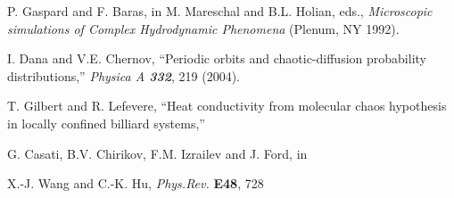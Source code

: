  P. Gaspard and F. Baras, in
	M. Mareschal and B.L. Holian, eds.,
	{\em Microscopic simulations of Complex Hydrodynamic
	Phenomena} (Plenum, NY 1992).

 I. Dana and V.E. Chernov,
	``Periodic orbits and chaotic-diffusion
	 probability distributions,''
	{\em Physica A \bf 332}, 219 (2004). %


 T. Gilbert  and R. Lefevere,
    ``Heat conductivity from molecular chaos hypothesis
             in locally confined billiard systems,''

 G. Casati, B.V. Chirikov, F.M. Izrailev and J. Ford, in

 X.-J. Wang and C.-K. Hu, {\em Phys.Rev.} {\bf E48}, 728


